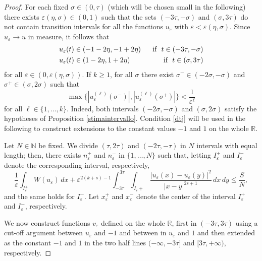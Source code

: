 \documentclass{article}
\newcommand{\e}{\varepsilon}
\begin{document}
\begin{proof}
For each fixed $\sigma\in (0,\tau)$ (which will be chosen small in the following) there exists $\e(\eta, \sigma)\in(0,1)$ such that the sets $(-3\tau,-\sigma)$ and $(\sigma,3\tau)$ do not contain transition intervals for all the functions $u_\e$ with $\e<\e(\eta, \sigma)$. 
Since $u_\e\to u$ in measure, it follows that 
\begin{eqnarray}\label{ur1}
&u_\e(t) \in (-1-2\eta, -1+2\eta) \ \ &\hbox{\rm if } \ t\in (-3\tau,-\sigma)\nonumber \\
&u_\e(t) \in (1-2\eta, 1+2\eta) \ \ &\hbox{\rm if } \ t\in (\sigma,3\tau)
\end{eqnarray} 
for all $\e\in (0,\e(\eta,\sigma))$. 
If $k\geq 1$, for all $\sigma$ there exist $\sigma^-\in (-2\sigma,-\sigma)$ and $\sigma^+\in (\sigma,2\sigma)$ such that 
\begin{equation}\label{dtj}
\max\{|u_\e^{(\ell)}(\sigma^-)|, |u_\e^{(\ell)}(\sigma^+)|\}<\frac{1}{\e^{\ell}} 
\end{equation}
for all $\ell\in\{1,\dots, k\}$. Indeed, both intervals $(-2\sigma,-\sigma)$ and $(\sigma,2\sigma)$ satisfy the 
hypotheses of Proposition \ref{stimaintervallo}. 
Condition \eqref{dtj} will be used in the following to construct extensions to the constant values $-1$ and $1$ on the whole $\mathbb R$. 


Let $N\in\mathbb N$ be fixed. 
We divide $(\tau,2\tau)$ and $(-2\tau,-\tau)$ in $N$ intervals with equal length; 
then, there exists $n^+_\e$ and $n_\e^-$ in $\{1,\dots, N\}$ such that, 
letting $I^+_\e$ and $I^-_\e$ denote the corresponding interval, respectively, 
\begin{equation}\label{enb}
\frac{1}{\e}\int_{I_\e^+}W(u_\e)\, dx+\e^{2(k+s)-1}\int_{-3\tau}^{3\tau}\int_{I_\e+}\frac{|u_\e(x)-u_\e(y)|^2}{|x-y|^{2s+1}}\,dx\,dy\leq \frac{S}{N}, 
\end{equation}
and the same holds for $I_\e^-$. 
Let $x^+_\e$ and $x_\e^-$ denote the center of the interval $I^+_\e$ and $I_\e^-$, respectively.  

We now construct functions $v_\e$ defined on the whole $\mathbb R$, first  in $(-3\tau, 3\tau)$ using a cut-off argument between $u_\e$ and $-1$ and between in $u_\e$ and $1$ and then extended as the constant $-1$ and $1$ in the two half lines $(-\infty, -3\tau]$ and $[3\tau,+\infty)$, respectively.  




\end{proof}
\end{document}
